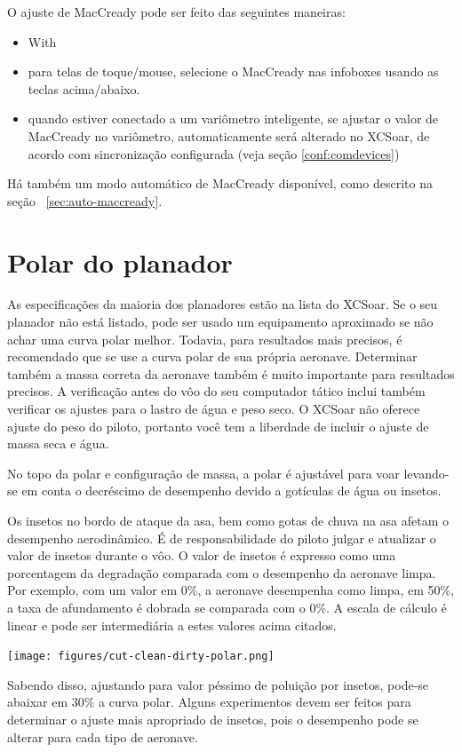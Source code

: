 O ajuste de MacCready pode ser feito das seguintes maneiras:
\begin{itemize}
\item With \blink{}
\item para telas de toque/mouse, selecione o MacCready nas infoboxes usando as teclas acima/abaixo.
\item quando estiver conectado a um variômetro inteligente, se ajustar o valor de MacCready no variômetro, automaticamente será alterado no XCSoar, de acordo com sincronização configurada (veja seção \ref{conf:comdevices})
\end{itemize}
Há também um modo automático de MacCready disponível, como descrito na seção ~\ref{sec:auto-maccready}.


\section{Polar do planador}\label{sec:glidepolar}

As especificações da maioria dos planadores estão na lista do XCSoar.  
Se o seu planador não está listado, pode ser usado um equipamento aproximado se não achar uma curva polar melhor.  Todavia, para resultados mais precisos, é recomendado que se use a curva polar de sua própria aeronave.  Determinar também a massa correta da aeronave também é muito importante para resultados precisos.  A verificação antes do vôo do seu computador tático inclui também verificar os ajustes para o lastro de água e peso seco.    O XCSoar não oferece ajuste do peso do piloto, portanto você tem a liberdade de incluir o ajuste de massa seca e água. 

No topo da polar e configuração de massa, a polar é ajustável para voar levando-se em conta o decréscimo de desempenho devido a gotículas de água ou insetos.

Os insetos no bordo de ataque da asa, bem como gotas de chuva na asa afetam o desempenho aerodinâmico.  É de responsabilidade do piloto julgar e atualizar o valor de insetos durante o vôo.  O valor de insetos é expresso como uma porcentagem da degradação comparada com o desempenho da aeronave limpa.  Por exemplo, com um valor em 0\%, a aeronave desempenha como limpa, em 50\%, a taxa de afundamento é dobrada se comparada com o 0\%.  A escala de cálculo é linear e pode ser intermediária a estes valores acima citados.

\begin{center}
\texttt{[image: figures/cut-clean-dirty-polar.png]}
\end{center}
Sabendo disso, ajustando para valor péssimo de poluição por insetos, pode-se abaixar em 30\% a curva polar.  Alguns experimentos devem ser feitos para determinar o ajuste mais apropriado de insetos, pois o desempenho pode se alterar para cada tipo de aeronave.

